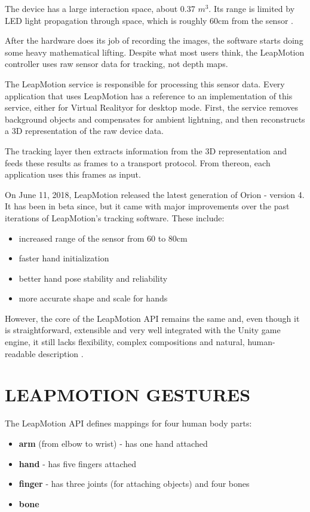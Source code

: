 \documentclass[chi_draft]{sigchi}
\def\leap{LeapMotion}
\def\vr{Virtual Reality}
\begin{document}
The device has a large interaction space, about 0.37 $m^3$. Its range is limited by LED light propagation through space, which is roughly 60cm from the sensor \cite{LeapArticle}.


After the hardware does its job of recording the images, the software starts doing some heavy mathematical lifting. Despite what most users think, the \leap{} controller uses raw sensor data for tracking, not depth maps.


The \leap{} service is responsible for processing this sensor data. Every application that uses \leap{} has a reference to an implementation of this service, either for \vr or for desktop mode. First, the service removes background objects and compensates for ambient lightning, and then reconstructs a 3D representation of the raw device data.


The tracking layer then extracts information from the 3D representation and feeds these results as frames to a transport protocol. From thereon, each application uses this frames as input.


On June 11, 2018, \leap{} released the latest generation of Orion - version 4. It has been in beta since, but it came with major improvements over the past iterations of \leap{}'s tracking software. These include:

\begin{itemize}
  \item increased range of the sensor from 60 to 80cm
  \item faster hand initialization
  \item better hand pose stability and reliability
  \item more accurate shape and scale for hands
\end{itemize}

However, the core of the \leap{} API remains the same and, even though it is straightforward, extensible and very well integrated with the Unity game engine, it still lacks flexibility, complex compositions and natural, human-readable description \cite{LMAPI}.

\section{LEAPMOTION GESTURES}

The \leap{} API \cite{LMAPI} defines mappings for four human body parts:\cite{LMAPI}

\begin{itemize}
  \item \textbf{arm} (from elbow to wrist) - has one hand attached
  \item \textbf{hand} - has five fingers attached
  \item \textbf{finger} - has three joints (for attaching objects) and four bones
  \item \textbf{bone}
\end{itemize}
\end{document}
